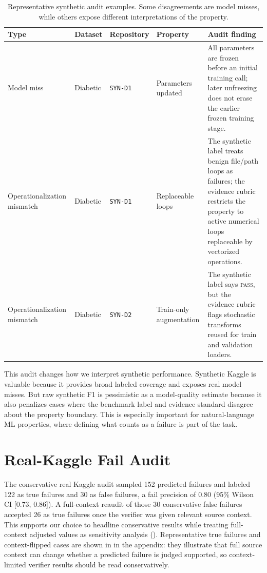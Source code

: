 \documentclass[11pt]{article}
\newcommand{\pass}{\textsc{pass}}
\begin{document}
\begin{table}[t]
  \centering
  \small
  \setlength{\tabcolsep}{4pt}
  \begin{tabularx}{\textwidth}{@{}p{2.0cm}p{1.4cm}p{2.15cm}p{2.25cm}X@{}}
    \toprule
    Type & Dataset & Repository & Property & Audit finding \\
    \midrule
    Model miss & Diabetic & \texttt{SYN-D1} & Parameters updated &
    All parameters are frozen before an initial training call; later unfreezing
    does not erase the earlier frozen training stage. \\
    Operationalization mismatch & Diabetic & \texttt{SYN-D1} & Replaceable loops &
    The synthetic label treats benign file/path loops as failures; the evidence
    rubric restricts the property to active numerical loops replaceable by
    vectorized operations. \\
    Operationalization mismatch & Diabetic & \texttt{SYN-D2} & Train-only augmentation &
    The synthetic label says \pass, but the evidence rubric flags stochastic
    transforms reused for train and validation loaders. \\
    \bottomrule
  \end{tabularx}
  \caption{Representative synthetic audit examples. Some disagreements are
  model misses, while others expose different interpretations of the property.}
  \label{tab:synthetic-examples}
\end{table}

This audit changes how we interpret synthetic performance.
Synthetic Kaggle is valuable because it provides broad labeled coverage and
exposes real model misses.
But raw synthetic F1 is pessimistic as a model-quality estimate because it also
penalizes cases where the benchmark label and evidence standard disagree about
the property boundary.
This is especially important for natural-language ML properties, where defining
what counts as a failure is part of the task.

\section{Real-Kaggle Fail Audit}
\label{sec:real-examples}

The conservative real Kaggle audit sampled 152 predicted failures and labeled 122
as true failures and 30 as false failures, a fail precision of 0.80 (95\% Wilson
CI [0.73, 0.86]).
A full-context reaudit of those 30 conservative false failures accepted 26 as
true failures once the verifier was given relevant source context.
This supports our choice to headline conservative results while treating
full-context adjusted values as sensitivity analysis ().
Representative true failures and context-flipped cases are shown in
 in the appendix: they illustrate that full source
context can change whether a predicted failure is judged supported, so
context-limited verifier results should be read conservatively.
\end{document}
